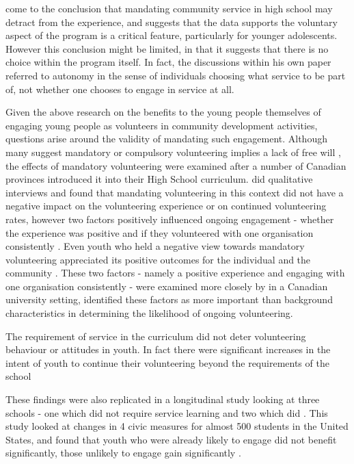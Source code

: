  \citet[][p635]{Allen1994} come to the conclusion that mandating community service in high school may detract from the experience, and suggests that the data supports the voluntary aspect of the program is a critical feature, particularly for younger adolescents. However this conclusion might be limited, in that it suggests that there is no choice within the program itself. In fact, the discussions within his own paper referred to autonomy in the sense of individuals choosing what service to be part of, not whether one chooses to engage in service at all.

Given the above research on the benefits to the young people themselves of engaging young people as volunteers in community development activities, questions arise around the validity of mandating such engagement. Although many suggest mandatory or compulsory volunteering implies a lack of free will \citep[cf.][]{McLellan2003}, the effects of mandatory volunteering were examined after a number of Canadian provinces introduced it into their High School curriculum. \citet{Brown2007} did qualitative interviews and found that mandating volunteering in this context did not have a negative impact on the volunteering experience or on continued volunteering rates, however two factors positively influenced ongoing engagement - whether the experience was positive and if they volunteered with one organisation consistently \citep{Brown2007}. Even youth who held a negative view towards mandatory volunteering appreciated its positive outcomes for the individual and the community \citep{Brown2007}. These two factors - namely a positive experience and engaging with one organisation consistently - were examined more closely by \citet{Taylor2007} in a Canadian university setting, identified these factors as more important than background characteristics in determining the likelihood of ongoing volunteering. 

The requirement of service in the curriculum did not deter volunteering behaviour or attitudes in youth. In fact there were significant increases in the intent of youth to continue their volunteering beyond the requirements of the school \citep{Metz2003}

These findings were also replicated in a longitudinal study looking at three schools - one which did not require service learning and two which did \citep{Metz2005}. This study looked at changes in 4 civic measures for almost 500 students in the United States, and found that youth who were already likely to engage did not benefit significantly, those unlikely to engage gain significantly \citep{Metz2005}. 

